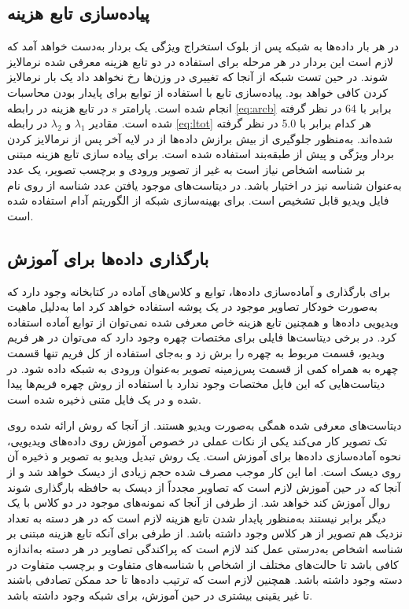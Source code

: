 \subsection{پیاده‌سازی تابع هزینه}
در هر بار  داده‌ها به شبکه پس از بلوک استخراج ویژگی یک بردار به‌دست خواهد آمد که لازم است این بردار در هر مرحله برای استفاده در دو تابع هزینه معرفی شده نرمالایز شوند. در حین تست شبکه از آنجا که تغییری در وزن‌ها رخ نخواهد داد یک بار نرمالایز کردن کافی خواهد بود. پیاده‌سازی تابع  با استفاده از توابع  برای پایدار بودن محاسبات انجام شده است. پارامتر 
$s$
در تابع هزینه
در رابطه 
\ref{eq:arcb}
برابر با 64 در نظر گرفته شده است. مقادیر 
$\lambda_1$
و
$\lambda_2$
 در رابطه 
\ref{eq:ltot}
 هر کدام برابر با 
5.0
 در نظر گرفته شده‌اند.
 به‌منظور جلوگیری از بیش برازش داده‌ها از 
\cite{srivastava2014dropout}
در لایه آخر پس از نرمالایز کردن بردار ویژگی و پیش از طبقه‌بند استفاده شده است. 
برای پیاده سازی تابع هزینه مبتنی بر شناسه اشخاص نیاز است به غیر از تصویر ورودی و برچسب تصویر، یک عدد به‌عنوان شناسه نیز در اختیار باشد. در دیتاست‌های موجود یافتن عدد شناسه از روی نام فایل ویدیو قابل تشخیص است. برای بهینه‌سازی شبکه از الگوریتم آدام 
\cite{kingma2014adam}
استفاده شده است.
\subsection{بارگذاری داده‌ها برای آموزش}
برای بارگذاری و آماده‌سازی داده‌ها، توابع و کلاس‌های آماده در کتابخانه  وجود دارد که به‌صورت خودکار تصاویر موجود در یک پوشه استفاده خواهد کرد اما به‌دلیل ماهیت ویدیویی داده‌ها و همچنین تابع هزینه خاص معرفی شده نمی‌توان از توابع آماده استفاده کرد.
در برخی دیتاست‌ها فایلی برای مختصات چهره وجود دارد که می‌توان در هر فریم ویدیو، قسمت مربوط به چهره را برش زد و به‌جای استفاده از کل فریم تنها قسمت چهره به همراه کمی از قسمت پس‌زمینه تصویر به‌عنوان ورودی به شبکه داده شود. در دیتاست‌هایی که این فایل مختصات وجود ندارد با استفاده از روش 
\cite{zhang2016joint}
 چهره فریم‌ها پیدا شده و در یک فایل متنی ذخیره شده است.
 
دیتاست‌های معرفی شده همگی به‌صورت ویدیو هستند. از آنجا که روش ارائه شده روی تک تصویر کار می‌کند یکی از نکات عملی در خصوص آموزش روی داده‌های ویدیویی، نحوه آماده‌سازی داده‌ها برای آموزش است. یک روش تبدیل ویدیو به تصویر و ذخیره آن روی دیسک است. اما این کار موجب مصرف شده حجم زیادی از دیسک خواهد شد و از آنجا که در حین آموزش لازم است که تصاویر مجدداً از دیسک به حافظه  بارگذاری شوند روال آموزش کند خواهد شد.
از طرفی از آنجا که نمونه‌های موجود در دو کلاس با یک دیگر برابر نیستند به‌منظور پایدار شدن تابع هزینه  لازم است که در هر دسته به تعداد نزدیک هم تصویر از هر کلاس وجود داشته باشد. از طرفی برای آنکه تابع هزینه مبتنی بر شناسه اشخاص به‌درستی عمل کند لازم است که پراکندگی تصاویر در هر دسته به‌اندازه کافی باشد تا حالت‌های مختلف از اشخاص با شناسه‌های متفاوت و برچسب متفاوت در دسته وجود داشته باشد. همچنین لازم است که ترتیب داده‌ها تا حد ممکن تصادفی باشند تا غیر یقینی بیشتری در حین آموزش، برای شبکه وجود داشته باشد. 

